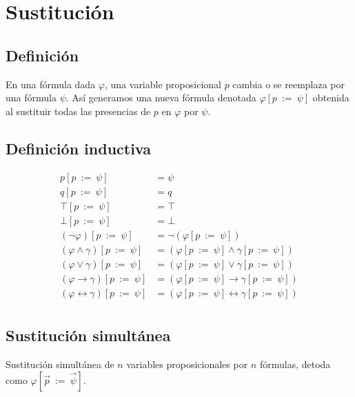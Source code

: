 \documentclass[a4paper]{article}
\begin{document}
\section{Sustitución}
\subsection{Definición}
\noindent
En una fórmula dada \(\varphi\), una variable proposicional \(p\) cambia o se reemplaza por una
fórmula \(\psi\). Así generamos una nueva fórmula denotada \(\varphi \left[p \ := \ \psi\right]\)
obtenida al sustituir todas las presencias de \(p\) en \(\varphi\) por \(\psi\).
\subsection{Definición inductiva}
\begin{align*}
    p\left[p \ := \ \psi \right] &= \psi \\
    q\left[p \ := \ \psi \right] &= q \\
    \top\left[p \ := \ \psi \right] &= \top \\
    \bot\left[p \ := \ \psi \right] &= \bot \\
    \left(\neg \varphi\right)\left[p \ := \ \psi \right] &= \neg \left(\varphi\left[p \ := \ \psi \right]\right) \\
    \left(\varphi \land \gamma \right)\left[p \ := \ \psi \right] &= \left(\varphi\left[p \ := \ \psi \right] \land \gamma\left[p \ := \ \psi \right]\right) \\
    \left(\varphi \lor \gamma \right)\left[p \ := \ \psi \right] &= \left(\varphi\left[p \ := \ \psi \right] \lor \gamma\left[p \ := \ \psi \right]\right) \\
    \left(\varphi \rightarrow \gamma \right)\left[p \ := \ \psi \right] &= \left(\varphi\left[p \ := \ \psi \right] \rightarrow \gamma\left[p \ := \ \psi \right]\right) \\
    \left(\varphi \leftrightarrow \gamma \right)\left[p \ := \ \psi \right] &= \left(\varphi\left[p \ := \ \psi \right] \leftrightarrow \gamma\left[p \ := \ \psi \right]\right) \\
\end{align*}
\subsection{Sustitución simultánea}
\noindent
Sustitución simultánea de \(n\) variables proposicionales por \(n\) fórmulas, detoda como 
\(\varphi\left[\vec{p} \ := \ \vec{\psi}\right]\).
\end{document}
